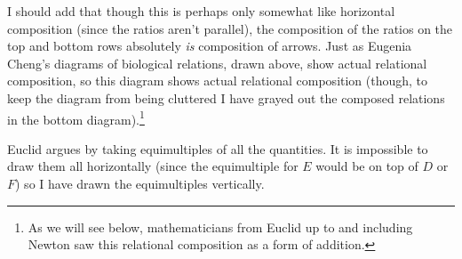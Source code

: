 \documentclass[11pt]{article}
\newcommand{\flushleftright}{\noindent\justifying}
\begin{document}
\flushleftright%
I should add that though this is perhaps only somewhat like horizontal composition (since the ratios aren't parallel), the composition of the ratios on the top and bottom rows absolutely \textit{is} composition of arrows. Just as Eugenia Cheng's diagrams of biological relations, drawn above, show actual relational composition, so this diagram shows actual relational composition (though, to keep the diagram from being cluttered I have grayed out the composed relations in the bottom diagram).\footnote{As we will see below, mathematicians from Euclid up to and including Newton saw this relational composition as a form of addition.}

Euclid argues by taking equimultiples of all the quantities. It is impossible to draw them all horizontally (since the equimultiple for $E$ would be on top of $D$ or $F$) so I have drawn the equimultiples vertically.
\end{document}
